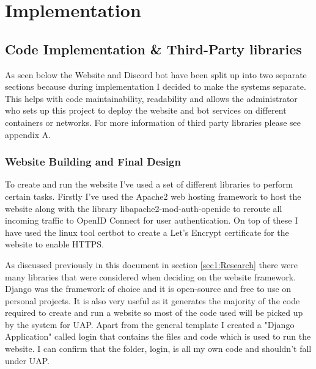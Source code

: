 \chapter{Implementation}

%
%

\section{Code Implementation \& Third-Party libraries}
As seen below the Website and Discord bot have been split up into two separate sections because during implementation I decided to make the systems separate. This helps with code maintainability, readability and allows the administrator who sets up this project to deploy the website and bot services on different containers or networks. For more information of third party libraries please see appendix A.

\subsection{Website Building and Final Design}
To create and run the website I've used a set of different libraries to perform certain tasks. Firstly I've used the Apache2 \cite{apache2} web hosting framework to host the website along with the library libapache2-mod-auth-openidc to reroute all incoming traffic to OpenID Connect \cite{OpenID} for user authentication. On top of these I have used the linux tool certbot \cite{certbot} to create a Let's Encrypt certificate for the website to enable HTTPS. 

As discussed previously in this document in section \ref{sec1:Research} there were many libraries that were considered when deciding on the website framework. Django \cite{Django} was the framework of choice and it is open-source and free to use on personal projects. It is also very useful as it generates the majority of the code required to create and run a website so most of the code used will be picked up by the system for UAP. Apart from the general template I created a "Django Application" called login that contains the files and code which is used to run the website. I can confirm that the folder, login, is all my own code and shouldn't fall under UAP.

